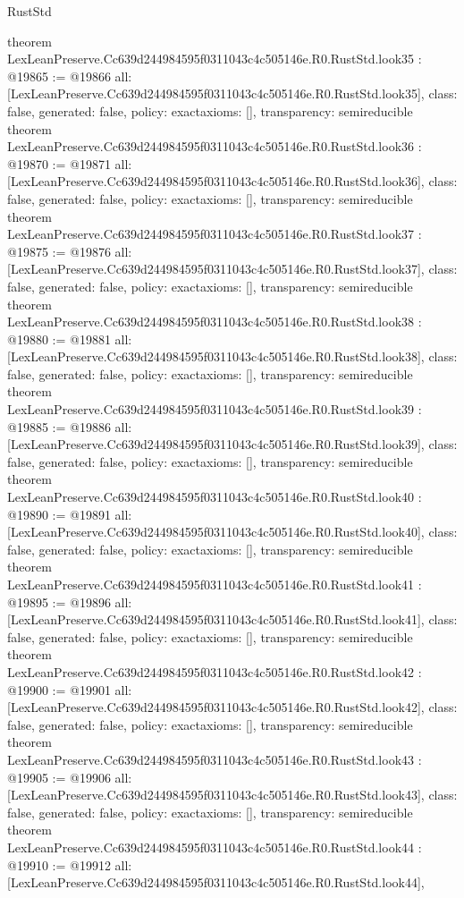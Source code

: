 \begin{lexlean}{RustStd}
\begin{coremodule}
{}
theorem LexLeanPreserve.Cc639d244984595f0311043c4c505146e.R0.RustStd.look35 : @19865 := @19866 {
  all: [LexLeanPreserve.Cc639d244984595f0311043c4c505146e.R0.RustStd.look35],
  class: false,
  generated: false,
  policy: exact{axioms: []},
  transparency: semireducible
}
theorem LexLeanPreserve.Cc639d244984595f0311043c4c505146e.R0.RustStd.look36 : @19870 := @19871 {
  all: [LexLeanPreserve.Cc639d244984595f0311043c4c505146e.R0.RustStd.look36],
  class: false,
  generated: false,
  policy: exact{axioms: []},
  transparency: semireducible
}
theorem LexLeanPreserve.Cc639d244984595f0311043c4c505146e.R0.RustStd.look37 : @19875 := @19876 {
  all: [LexLeanPreserve.Cc639d244984595f0311043c4c505146e.R0.RustStd.look37],
  class: false,
  generated: false,
  policy: exact{axioms: []},
  transparency: semireducible
}
theorem LexLeanPreserve.Cc639d244984595f0311043c4c505146e.R0.RustStd.look38 : @19880 := @19881 {
  all: [LexLeanPreserve.Cc639d244984595f0311043c4c505146e.R0.RustStd.look38],
  class: false,
  generated: false,
  policy: exact{axioms: []},
  transparency: semireducible
}
theorem LexLeanPreserve.Cc639d244984595f0311043c4c505146e.R0.RustStd.look39 : @19885 := @19886 {
  all: [LexLeanPreserve.Cc639d244984595f0311043c4c505146e.R0.RustStd.look39],
  class: false,
  generated: false,
  policy: exact{axioms: []},
  transparency: semireducible
}
theorem LexLeanPreserve.Cc639d244984595f0311043c4c505146e.R0.RustStd.look40 : @19890 := @19891 {
  all: [LexLeanPreserve.Cc639d244984595f0311043c4c505146e.R0.RustStd.look40],
  class: false,
  generated: false,
  policy: exact{axioms: []},
  transparency: semireducible
}
theorem LexLeanPreserve.Cc639d244984595f0311043c4c505146e.R0.RustStd.look41 : @19895 := @19896 {
  all: [LexLeanPreserve.Cc639d244984595f0311043c4c505146e.R0.RustStd.look41],
  class: false,
  generated: false,
  policy: exact{axioms: []},
  transparency: semireducible
}
theorem LexLeanPreserve.Cc639d244984595f0311043c4c505146e.R0.RustStd.look42 : @19900 := @19901 {
  all: [LexLeanPreserve.Cc639d244984595f0311043c4c505146e.R0.RustStd.look42],
  class: false,
  generated: false,
  policy: exact{axioms: []},
  transparency: semireducible
}
theorem LexLeanPreserve.Cc639d244984595f0311043c4c505146e.R0.RustStd.look43 : @19905 := @19906 {
  all: [LexLeanPreserve.Cc639d244984595f0311043c4c505146e.R0.RustStd.look43],
  class: false,
  generated: false,
  policy: exact{axioms: []},
  transparency: semireducible
}
theorem LexLeanPreserve.Cc639d244984595f0311043c4c505146e.R0.RustStd.look44 : @19910 := @19912 {
  all: [LexLeanPreserve.Cc639d244984595f0311043c4c505146e.R0.RustStd.look44],
}
\end{coremodule}
\end{lexlean}

